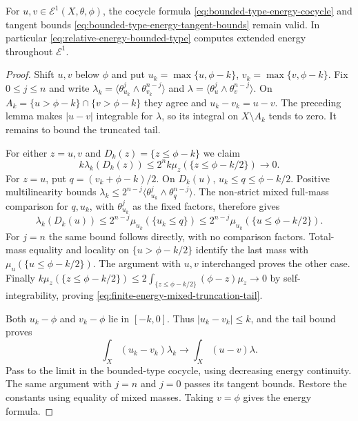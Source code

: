 \begin{proposition}\label{prop:relative-finite-energy-cocycle}
For $u,v\in\mathcal E^1(X,\theta,\phi)$, the cocycle formula \eqref{eq:bounded-type-energy-cocycle} and tangent bounds \eqref{eq:bounded-type-energy-tangent-bounds} remain valid. In particular \eqref{eq:relative-energy-bounded-type} computes extended energy throughout $\mathcal E^1$.
\end{proposition}
\begin{proof}
Shift $u,v$ below $\phi$ and put $u_k=\max\{u,\phi-k\}$, $v_k=\max\{v,\phi-k\}$. Fix $0\leq j\leq n$ and write
$\lambda_k=\langle\theta_{u_k}^j\wedge\theta_{v_k}^{n-j}\rangle$ and $\lambda=\langle\theta_u^j\wedge\theta_v^{n-j}\rangle$.
On $A_k=\{u>\phi-k\}\cap\{v>\phi-k\}$ they agree and $u_k-v_k=u-v$. The preceding lemma makes $|u-v|$ integrable for $\lambda$, so its integral on $X\setminus A_k$ tends to zero. It remains to bound the truncated tail.

For either $z=u,v$ and $D_k(z)=\{z\leq\phi-k\}$ we claim
\begin{equation}\label{eq:finite-energy-mixed-truncation-tail}
 k\lambda_k(D_k(z))\leq
                         2^n k\mu_z(\{z\leq\phi-k/2\})\longrightarrow0.
\end{equation}
For $z=u$, put $q=(v_k+\phi-k)/2$. On $D_k(u)$,
$u_k\leq q\leq\phi-k/2$. Positive multilinearity bounds
$\lambda_k\leq2^{n-j}\langle\theta_{u_k}^j\wedge\theta_q^{n-j}\rangle$.
The non-strict mixed full-mass comparison for $q,u_k$, with $\theta_{u_k}^j$ as the fixed factors, therefore gives
\[
 \lambda_k(D_k(u))
   \leq2^{n-j}\mu_{u_k}(\{u_k\leq q\})
   \leq2^{n-j}\mu_{u_k}(\{u\leq\phi-k/2\}).
\]
For $j=n$ the same bound follows directly, with no comparison factors. Total-mass equality and locality on $\{u>\phi-k/2\}$ identify the last mass with $\mu_u(\{u\leq\phi-k/2\})$. The argument with $u,v$ interchanged proves the other case. Finally
$k\mu_z(\{z\leq\phi-k/2\})\leq2\int_{\{z\leq\phi-k/2\}}(\phi-z)\mu_z\to0$
by self-integrability, proving \eqref{eq:finite-energy-mixed-truncation-tail}.

Both $u_k-\phi$ and $v_k-\phi$ lie in $[-k,0]$. Thus $|u_k-v_k|\leq k$, and the tail bound proves
\[
 \int_X(u_k-v_k)\lambda_k\longrightarrow\int_X(u-v)\lambda.
\]
Pass to the limit in the bounded-type cocycle, using decreasing energy continuity. The same argument with $j=n$ and $j=0$ passes its tangent bounds. Restore the constants using equality of mixed masses. Taking $v=\phi$ gives the energy formula.
\end{proof}

